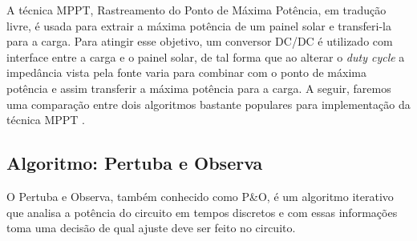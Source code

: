 A técnica MPPT, Rastreamento do Ponto de Máxima Potência, em tradução livre, é usada para extrair a máxima potência de um painel solar e transferi-la para a carga. Para atingir esse objetivo, um conversor DC/DC é utilizado com interface entre a carga e o painel solar, de tal forma que ao alterar o \textit{duty cycle} a impedância vista pela fonte varia para combinar com o ponto de máxima potência e assim transferir a máxima potência para a carga. A seguir, faremos uma comparação entre dois algoritmos bastante populares para implementação da técnica MPPT \cite{mppt_comparison}.

\subsection*{Algoritmo: Pertuba e Observa}
O Pertuba e Observa, também conhecido como P\&O, é um algoritmo iterativo que analisa a potência do circuito em tempos discretos e com essas informações toma uma decisão de qual ajuste deve ser feito no circuito. 

\noindent
\begin{minipage}{\linewidth}
\label{PO_flux_fig}
\end{minipage}

